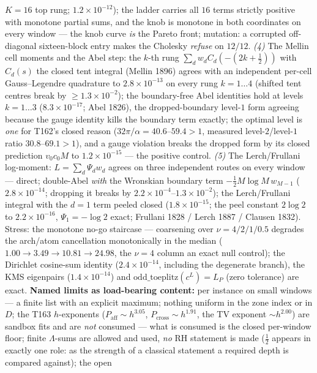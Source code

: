\documentclass[11pt,a4paper]{article}
\begin{document}
$K=16$ top rung; $1.2\times10^{-12}$); the ladder carries all $16$
terms strictly positive with monotone partial sums, and the knob is
monotone in both coordinates on every window --- the knob curve
\emph{is} the Pareto front; mutation: a corrupted off-diagonal
sixteen-block entry makes the Cholesky \emph{refuse} on $12/12$.
\emph{(4)} The Mellin cell moments and the Abel step: the $k$-th rung
$\sum_dw_dC_d(-(2k+\tfrac12))$ with $C_d(s)$ the closed tent integral
(Mellin 1896) agrees with an independent per-cell Gauss--Legendre
quadrature to $2.8\times10^{-13}$ on every rung $k=1\ldots4$ (shifted
tent centres break by $\ge1.3\times10^{-2}$); the boundary-free Abel
identities hold at levels $k=1\ldots3$ ($8.3\times10^{-17}$; Abel
1826), the dropped-boundary level-$1$ form agreeing because the gauge
identity kills the boundary term exactly; the optimal level is
\emph{one} for T162's closed reason ($32\pi/\alpha=40.6$--$59.4>1$,
measured level-$2$/level-$1$ ratio $30.8$--$69.1>1$), and a gauge
violation breaks the dropped form by its closed prediction $v_0c_0M$
to $1.2\times10^{-15}$ --- the positive control. \emph{(5)} The
Lerch/Frullani log-moment: $L=\sum_d\Psi_dw_d$ agrees on three
independent routes on every window --- direct; double-Abel \emph{with}
the Wronskian boundary term $-\tfrac12M\log M\,w_{M-1}$
($2.8\times10^{-14}$; dropping it breaks by
$2.2\times10^{-4}$--$1.3\times10^{-2}$); the Lerch/Frullani integral
with the $d=1$ term peeled closed ($1.8\times10^{-15}$; the peel
constant $2\log2$ to $2.2\times10^{-16}$, $\Psi_1=-\log2$ exact;
Frullani 1828 / Lerch 1887 / Clausen 1832). Stress: the monotone no-go
staircase --- coarsening over $\nu=4/2/1/0.5$ degrades the arch/atom
cancellation monotonically in the median
($1.00\to3.49\to10.81\to24.98$, the $\nu=4$ column an exact null
control); the Dirichlet cosine-sum identity ($2.4\times10^{-14}$,
including the degenerate branch), the KMS eigenpairs
($1.4\times10^{-14}$) and $\mathrm{odd\_toeplitz}(c^L)=L_P$ (zero
tolerance) are exact.
\textbf{Named limits as load-bearing content:} per instance on small
windows --- a finite list with an explicit maximum; nothing uniform in
the zone index or in $D$; the T163 $h$-exponents
($P_{\mathrm{aff}}\sim h^{3.05}$, $P_{\mathrm{cross}}\sim h^{1.91}$,
the TV exponent $\sim h^{2.00}$) are sandbox fits and are \emph{not}
consumed --- what is consumed is the closed per-window floor; finite
$\Lambda$-sums are allowed and used, \emph{no} RH statement is made
($\tfrac12$ appears in exactly one role: as the strength of a
classical statement a required depth is compared against); the open
\end{document}
